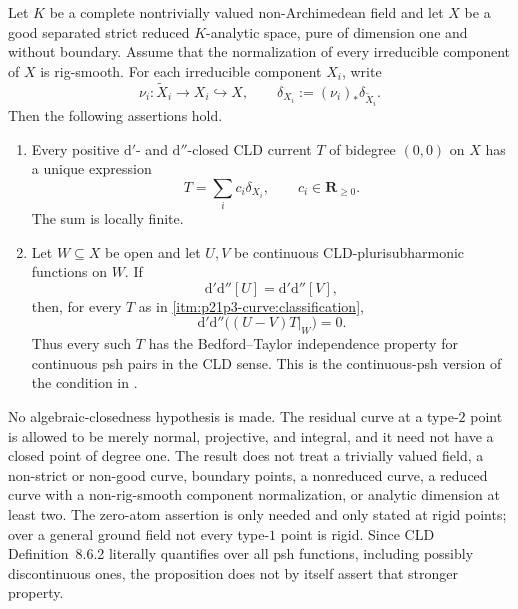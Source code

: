\begin{proposition}
\label{prop:p21p3-curve-rigidity}
Let $K$ be a
complete nontrivially valued non-Archimedean field and let $X$ be a good
separated strict reduced $K$-analytic space, pure of dimension one and
without boundary.  Assume that the normalization of every irreducible
component of $X$ is rig-smooth.  For each irreducible component $X_i$,
write
\[
        \nu_i:\widetilde X_i\longrightarrow X_i\hookrightarrow X,
        \qquad
        \delta_{X_i}:=(\nu_i)_*\delta_{\widetilde X_i}.
\]
Then the following assertions hold.

\begin{enumerate}
\item\label{itm:p21p3-curve:classification}
Every positive $\mathrm d'$- and $\mathrm d''$-closed CLD current $T$
of bidegree $(0,0)$ on $X$ has a unique expression
\begin{equation}
\label{eq:p21p3-curve-classification}
                         T=\sum_i c_i\delta_{X_i},
                         \qquad c_i\in\mathbf R_{\geq0}.
\end{equation}
The sum is locally finite.

\item\label{itm:p21p3-curve:bedford-taylor}
Let $W\subseteq X$ be open and let $U,V$ be continuous
CLD-plurisubharmonic functions on $W$.  If
\begin{equation}
\label{eq:p21p3-curve-equal-curvature}
           \mathrm d'\mathrm d''[U]
           =\mathrm d'\mathrm d''[V],
\end{equation}
then, for every $T$ as in
\cref{itm:p21p3-curve:classification},
\begin{equation}
\label{eq:p21p3-curve-bt-conclusion}
             \mathrm d'\mathrm d''\bigl((U-V)T|_W\bigr)=0.
\end{equation}
Thus every such $T$ has the Bedford--Taylor independence property for
continuous psh pairs in the CLD sense.  This is the continuous-psh version
of the condition in \cite[Definition~8.6.2]{CLD25}.
\end{enumerate}
\end{proposition}

\begin{remark}
\label{rem:p21p3-curve-scope}
No algebraic-closedness hypothesis is made.  The residual curve at a
type-$2$ point is allowed to be merely normal, projective, and integral,
and it need not have a closed point of degree one.  The result does not
treat a trivially valued field, a non-strict or non-good curve, boundary
points, a nonreduced curve, a reduced curve with a non-rig-smooth component
normalization, or analytic dimension at least two.  The zero-atom assertion
is only needed and only stated at rigid points; over a general ground field
not every type-$1$ point is rigid.  Since CLD Definition~8.6.2 literally
quantifies over all psh functions, including possibly discontinuous ones,
the proposition does not by itself assert that stronger property.
\end{remark}
